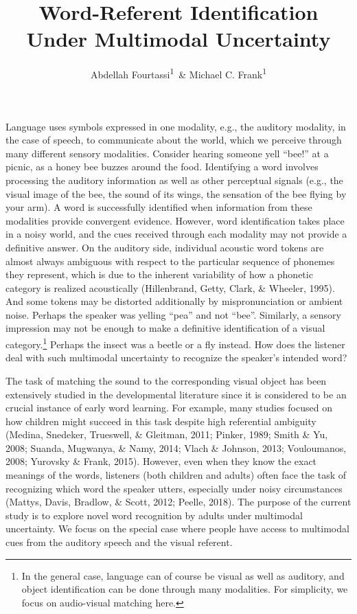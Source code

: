 \documentclass[english,floatsintext,man]{apa6}
\title{Word-Referent Identification Under Multimodal Uncertainty}
\author{Abdellah Fourtassi\textsuperscript{1}~\& Michael C. Frank\textsuperscript{1}}
\affiliation{
    \vspace{0.5cm}
          \textsuperscript{1} Department of Psychology, Stanford University  }
\theoremstyle{definition}
\theoremstyle{definition}
\theoremstyle{definition}
\theoremstyle{remark}
\begin{document}
\maketitle

\setcounter{secnumdepth}{0}



Language uses symbols expressed in one modality, e.g., the auditory
modality, in the case of speech, to communicate about the world, which
we perceive through many different sensory modalities. Consider hearing
someone yell \enquote{bee!} at a picnic, as a honey bee buzzes around
the food. Identifying a word involves processing the auditory
information as well as other perceptual signals (e.g., the visual image
of the bee, the sound of its wings, the sensation of the bee flying by
your arm). A word is successfully identified when information from these
modalities provide convergent evidence. However, word identification
takes place in a noisy world, and the cues received through each
modality may not provide a definitive answer. On the auditory side,
individual acoustic word tokens are almost always ambiguous with respect
to the particular sequence of phonemes they represent, which is due to
the inherent variability of how a phonetic category is realized
acoustically (Hillenbrand, Getty, Clark, \& Wheeler, 1995). And some
tokens may be distorted additionally by mispronunciation or ambient
noise. Perhaps the speaker was yelling \enquote{pea} and not
\enquote{bee}. Similarly, a sensory impression may not be enough to make
a definitive identification of a visual
category.\footnote{In the general case, language can of course be visual as well as auditory, and object identification can be done through many modalities. For simplicity, we focus on audio-visual matching here.}
Perhaps the insect was a beetle or a fly instead. How does the listener
deal with such multimodal uncertainty to recognize the speaker's
intended word?

The task of matching the sound to the corresponding visual object has
been extensively studied in the developmental literature since it is
considered to be an crucial instance of early word learning. For
example, many studies focused on how children might succeed in this task
despite high referential ambiguity (Medina, Snedeker, Trueswell, \&
Gleitman, 2011; Pinker, 1989; Smith \& Yu, 2008; Suanda, Mugwanya, \&
Namy, 2014; Vlach \& Johnson, 2013; Vouloumanos, 2008; Yurovsky \&
Frank, 2015). However, even when they know the exact meanings of the
words, listeners (both children and adults) often face the task of
recognizing which word the speaker utters, especially under noisy
circumstances (Mattys, Davis, Bradlow, \& Scott, 2012; Peelle, 2018).
The purpose of the current study is to explore novel word recognition by
adults under multimodal uncertainty. We focus on the special case where
people have access to multimodal cues from the auditory speech and the
visual referent.
\end{document}
